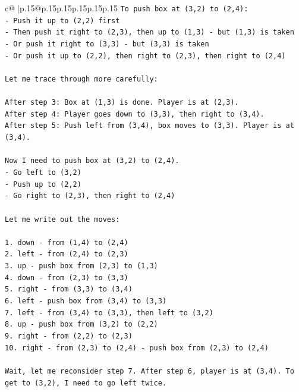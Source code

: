 \documentclass{article}
\begin{document}
{\begin{supertabular}{c@{$\;$}|p{.15\linewidth}@{}p{.15\linewidth}p{.15\linewidth}p{.15\linewidth}p{.15\linewidth}p{.15\linewidth}}
{{{\texttt{To push box at (3,2) to (2,4):} \\
\texttt{{-} Push it up to (2,2) first} \\
\texttt{{-} Then push it right to (2,3), then up to (1,3) {-} but (1,3) is taken} \\
\texttt{{-} Or push it right to (3,3) {-} but (3,3) is taken} \\
\texttt{{-} Or push it up to (2,2), then right to (2,3), then right to (2,4)} \\
\\ 
\texttt{Let me trace through more carefully:} \\
\\ 
\texttt{After step 3: Box at (1,3) is done. Player is at (2,3).} \\
\texttt{After step 4: Player goes down to (3,3), then right to (3,4).} \\
\texttt{After step 5: Push left from (3,4), box moves to (3,3). Player is at (3,4).} \\
\\ 
\texttt{Now I need to push box at (3,2) to (2,4).} \\
\texttt{{-} Go left to (3,2)} \\
\texttt{{-} Push up to (2,2)} \\
\texttt{{-} Go right to (2,3), then right to (2,4)} \\
\\ 
\texttt{Let me write out the moves:} \\
\\ 
\texttt{1. down {-} from (1,4) to (2,4)} \\
\texttt{2. left {-} from (2,4) to (2,3)} \\
\texttt{3. up {-} push box from (2,3) to (1,3)} \\
\texttt{4. down {-} from (2,3) to (3,3)} \\
\texttt{5. right {-} from (3,3) to (3,4)} \\
\texttt{6. left {-} push box from (3,4) to (3,3)} \\
\texttt{7. left {-} from (3,4) to (3,3), then left to (3,2)} \\
\texttt{8. up {-} push box from (3,2) to (2,2)} \\
\texttt{9. right {-} from (2,2) to (2,3)} \\
\texttt{10. right {-} from (2,3) to (2,4) {-} push box from (2,3) to (2,4)} \\
\\ 
\texttt{Wait, let me reconsider step 7. After step 6, player is at (3,4). To get to (3,2), I need to go left twice.} \\
}}}
\end{supertabular}}
\end{document}
